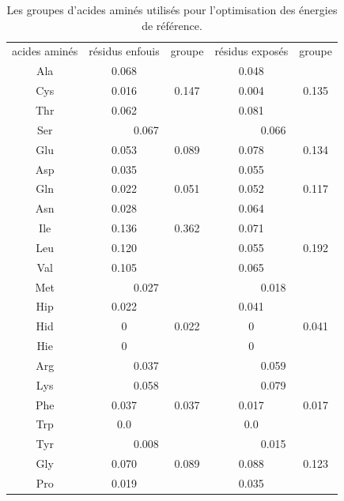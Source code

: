     \begin{table}[!htbp]
      \centering

      \begin{tabular}{c|cc|cc}

        \toprule
        acides aminés & résidus enfouis & groupe & résidus exposés & groupe\\
        \cmidrule{1-5}

        Ala &         0.068 &       &   0.048   \\
        Cys &         0.016 &  0.147  &   0.004 & 0.135  \\    
        Thr &         0.062 &        &   0.081   \\
        \cmidrule{1-5}
        Ser &        \multicolumn{2}{c|}{0.067}     &   \multicolumn{2}{c}{0.066}  \\
        \cmidrule{1-5}
        Glu &         0.053 & 0.089        &   0.078 & 0.134 \\
        Asp &         0.035 &    &   0.055   \\
        \cmidrule{1-5}
        Gln &         0.022 & 0.051 &   0.052 & 0.117\\
        Asn &         0.028 &         &   0.064   \\
        \cmidrule{1-5}
        Ile &         0.136 & 0.362        &   0.071  \\
        Leu &         0.120 &   &   0.055 & 0.192 \\
        Val &         0.105 &         &   0.065  \\
        \cmidrule{1-5}
        Met &    \multicolumn{2}{c|}{0.027}      &  \multicolumn{2}{c}{0.018} \\
        \cmidrule{1-5}
        Hip &         0.022 &      &   0.041 \\
        Hid &         0     &  0.022 &   0    & 0.041\\
        Hie &         0     &        &   0     \\
        \cmidrule{1-5}
        Arg &        \multicolumn{2}{c|}{0.037}      &  \multicolumn{2}{c}{0.059}\\
        \cmidrule{1-5}
        Lys &        \multicolumn{2}{c|}{0.058}         &  \multicolumn{2}{c}{0.079} \\
        \cmidrule{1-5}
        Phe &         0.037 &  0.037  &   0.017 & 0.017 \\
        Trp &         0.0   &        &   0.0  \\
        \cmidrule{1-5}
        Tyr &       \multicolumn{2}{c|}{0.008}      &  \multicolumn{2}{c}{0.015}\\
        \cmidrule{1-5}
        Gly &         0.070  & 0.089 &   0.088 & 0.123\\
        Pro &         0.019  &        &   0.035  \\
        \bottomrule


      \end{tabular}      
      \caption{Les groupes d'acides aminés utilisés pour l'optimisation des énergies de référence.}
\label{tab:AA_groupes}      
    \end{table}


